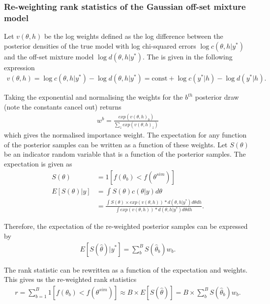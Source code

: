 \documentclass[12pt, a4paper]{article}
\begin{document}
    \subsubsection{Re-weighting rank statistics of the Gaussian off-set mixture model}
    Let $v(\theta, h)$ be the log weights defined as the log difference between the posterior densities of the true model with log chi-squared errors $\log c(\theta, h | y^{\ast})$ and the off-set mixture model $\log d(\theta, h | y^{\ast})$. The is given in the following expression
    \begin{align}
        v(\theta, h) = \log c(\theta, h | y^{\ast}) - \log  d(\theta, h | y^{\ast}) = \text{const} + \log c(y^{\ast}|h) - \log d(y^{\ast} | h).
    \end{align}

    Taking the exponential and normalising the weights for the $b^{th}$ posterior draw (note the constants cancel out) returns
    \begin{align}
    w^b = \frac{exp(v(\theta, h)_b)}{\sum_z exp(v(\theta, h)_z)}
    \end{align}
    which gives the normalised importance weight. The expectation for any function of the posterior samples can be written as a function of these weights. Let $S(\theta)$ be an indicator random variable that is a function of the posterior samples. The expectation is given as
    \begin{align}
    S(\theta) &= 1[f(\theta_b) < f(\theta^{sim})] \\
    E[S(\theta) | y] &= \int S(\theta) c(\theta | y) d\theta\\ 
    &= \frac{\int S(\theta)\times exp(v(\theta, h)) * d(\theta, h | y^{\ast})d\theta d h}{\int exp(v(\theta, h)) * d(\theta, h | y^{\ast})d\theta d h}.
    \end{align}
    
    Therefore, the expectation of the re-weighted posterior samples can be expressed by
    \begin{align}
    E[S(\hat{\theta}) | y^{\ast}] = \sum_b^B S(\hat{\theta}_b)w_b.
    \end{align}

    The rank statistic can be rewritten as a function of the expectation and weights. This gives us the re-weighted rank statistics
    \begin{align}
    r = \sum_{b=1}^{B}1[f(\theta_{b}) < f(\theta^{sim})] \approx  B\times E[S(\hat{\theta})] = B\times \sum_b^B S(\hat{\theta}_b)w_b.
    \end{align}
\end{document}
